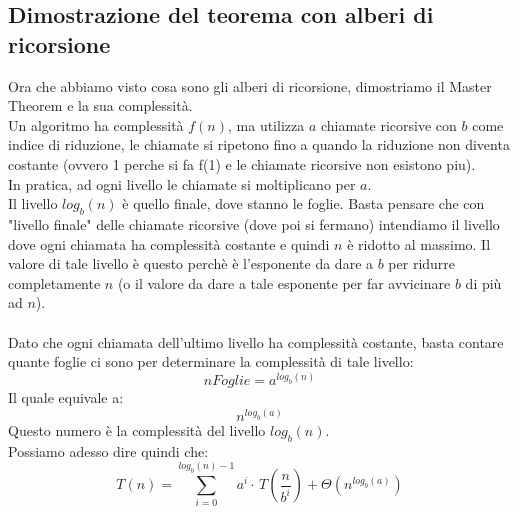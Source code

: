 \documentclass[a4paper,12pt]{article}
\begin{document}
\subsection{Dimostrazione del teorema con alberi di ricorsione}
Ora che abbiamo visto cosa sono gli alberi di ricorsione, dimostriamo il Master Theorem e la sua complessità.\\
Un algoritmo ha complessità $f(n)$, ma utilizza $a$ chiamate ricorsive con $b$ come indice di riduzione, le chiamate si ripetono fino a quando la riduzione non diventa costante (ovvero 1 perche si fa f(1) e le chiamate ricorsive non esistono piu).\\
In pratica, ad ogni livello le chiamate si moltiplicano per $a$.\\
Il livello $log_b(n)$ è quello finale, dove stanno le foglie. Basta pensare che con "livello finale" delle chiamate ricorsive (dove poi si fermano) intendiamo il livello dove ogni chiamata ha complessità costante e quindi $n$ è ridotto al massimo. Il valore di tale livello è questo perchè è l'esponente da dare a $b$ per ridurre completamente $n$ (o il valore da dare a tale esponente per far avvicinare $b$ di più ad $n$).\\\\
Dato che ogni chiamata dell'ultimo livello ha complessità costante, basta contare quante foglie ci sono per determinare la complessità di tale livello:
\[
nFoglie = a^{log_b(n)}
\] 
Il quale equivale a:
\[
n^{log_b(a)}
\]
Questo numero è la complessità del livello $log_b(n)$.\\
Possiamo adesso dire quindi che:
\[
T(n) = \sum_{i = 0}^{log_b(n) - 1} a^i \cdot \,T\!\left(\frac{n}{b^i}\right) + \Theta(n^{log_b(a)})
\]
\end{document}
